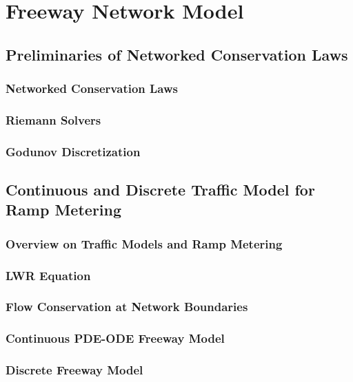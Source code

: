 \chapter{Freeway Network Model}

\section{Preliminaries of Networked Conservation Laws}

\subsection{Networked Conservation Laws}

\subsection{Riemann Solvers}

\subsection{Godunov Discretization}

\section{Continuous and Discrete Traffic Model for Ramp Metering}
\label{sec:continous-and-discrete-traffic-model-for-ramp-metering}

\subsection{Overview on Traffic Models and Ramp Metering}

\subsection{LWR Equation}

\subsection{Flow Conservation at Network Boundaries}

\subsection{Continuous PDE-ODE Freeway Model}

\subsection{Discrete Freeway Model}